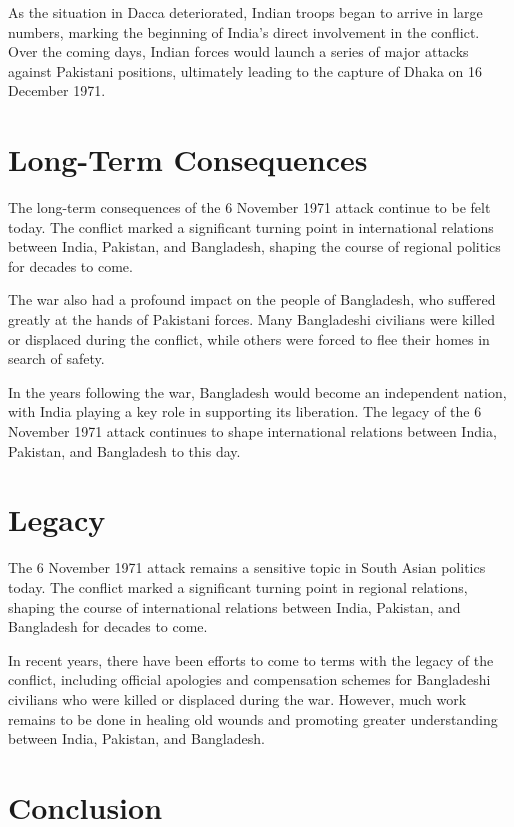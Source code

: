 As the situation in Dacca deteriorated, Indian troops began to arrive in large numbers, marking the beginning of India's direct involvement in the conflict. Over the coming days, Indian forces would launch a series of major attacks against Pakistani positions, ultimately leading to the capture of Dhaka on 16 December 1971.

\section{Long-Term Consequences}

The long-term consequences of the 6 November 1971 attack continue to be felt today. The conflict marked a significant turning point in international relations between India, Pakistan, and Bangladesh, shaping the course of regional politics for decades to come.

The war also had a profound impact on the people of Bangladesh, who suffered greatly at the hands of Pakistani forces. Many Bangladeshi civilians were killed or displaced during the conflict, while others were forced to flee their homes in search of safety.

In the years following the war, Bangladesh would become an independent nation, with India playing a key role in supporting its liberation. The legacy of the 6 November 1971 attack continues to shape international relations between India, Pakistan, and Bangladesh to this day.

\section{Legacy}

The 6 November 1971 attack remains a sensitive topic in South Asian politics today. The conflict marked a significant turning point in regional relations, shaping the course of international relations between India, Pakistan, and Bangladesh for decades to come.

In recent years, there have been efforts to come to terms with the legacy of the conflict, including official apologies and compensation schemes for Bangladeshi civilians who were killed or displaced during the war. However, much work remains to be done in healing old wounds and promoting greater understanding between India, Pakistan, and Bangladesh.

\section{Conclusion}

